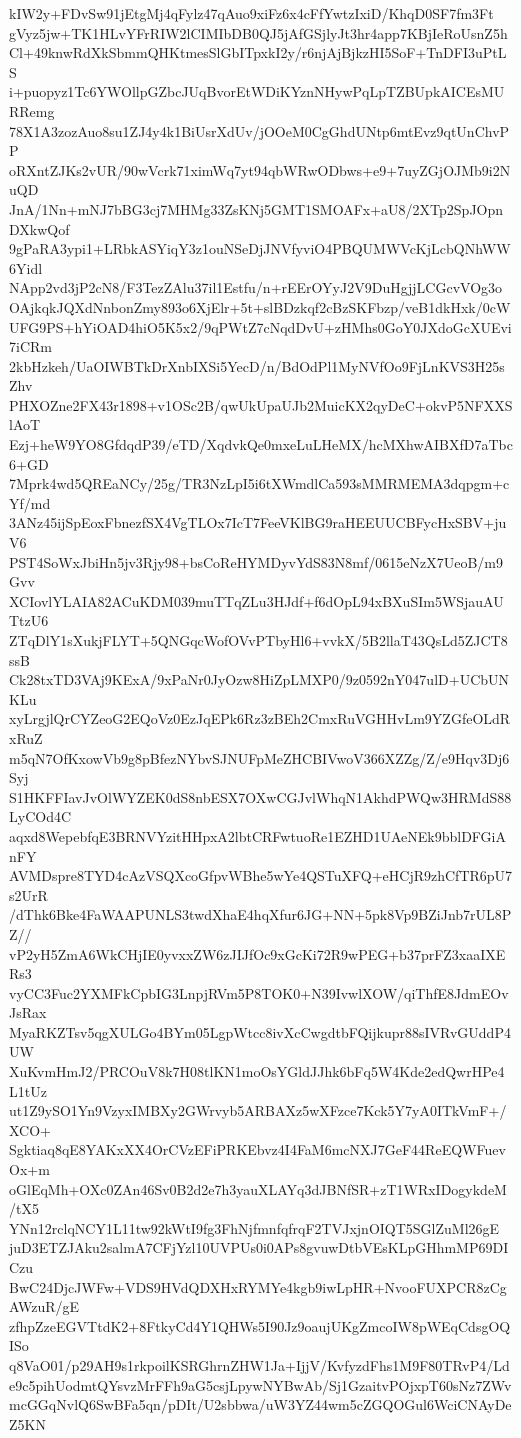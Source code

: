 kIW2y+FDvSw91jEtgMj4qFylz47qAuo9xiFz6x4cFfYwtzIxiD/KhqD0SF7fm3Ft
gVyz5jw+TK1HLvYFrRIW2lCIMIbDB0QJ5jAfGSjlyJt3hr4app7KBjIeRoUsnZ5h
Cl+49knwRdXkSbmmQHKtmesSlGbITpxkI2y/r6njAjBjkzHI5SoF+TnDFI3uPtLS
i+puopyz1Tc6YWOllpGZbcJUqBvorEtWDiKYznNHywPqLpTZBUpkAICEsMURRemg
78X1A3zozAuo8su1ZJ4y4k1BiUsrXdUv/jOOeM0CgGhdUNtp6mtEvz9qtUnChvPP
oRXntZJKs2vUR/90wVcrk71ximWq7yt94qbWRwODbws+e9+7uyZGjOJMb9i2NuQD
JnA/1Nn+mNJ7bBG3cj7MHMg33ZsKNj5GMT1SMOAFx+aU8/2XTp2SpJOpnDXkwQof
9gPaRA3ypi1+LRbkASYiqY3z1ouNSeDjJNVfyviO4PBQUMWVcKjLcbQNhWW6Yidl
NApp2vd3jP2cN8/F3TezZAlu37il1Estfu/n+rEErOYyJ2V9DuHgjjLCGcvVOg3o
OAjkqkJQXdNnbonZmy893o6XjElr+5t+slBDzkqf2cBzSKFbzp/veB1dkHxk/0cW
UFG9PS+hYiOAD4hiO5K5x2/9qPWtZ7cNqdDvU+zHMhs0GoY0JXdoGcXUEvi7iCRm
2kbHzkeh/UaOIWBTkDrXnbIXSi5YecD/n/BdOdPl1MyNVfOo9FjLnKVS3H25sZhv
PHXOZne2FX43r1898+v1OSc2B/qwUkUpaUJb2MuicKX2qyDeC+okvP5NFXXSlAoT
Ezj+heW9YO8GfdqdP39/eTD/XqdvkQe0mxeLuLHeMX/hcMXhwAIBXfD7aTbc6+GD
7Mprk4wd5QREaNCy/25g/TR3NzLpI5i6tXWmdlCa593sMMRMEMA3dqpgm+cYf/md
3ANz45ijSpEoxFbnezfSX4VgTLOx7IcT7FeeVKlBG9raHEEUUCBFycHxSBV+juV6
PST4SoWxJbiHn5jv3Rjy98+bsCoReHYMDyvYdS83N8mf/0615eNzX7UeoB/m9Gvv
XCIovlYLAIA82ACuKDM039muTTqZLu3HJdf+f6dOpL94xBXuSIm5WSjauAUTtzU6
ZTqDlY1sXukjFLYT+5QNGqcWofOVvPTbyHl6+vvkX/5B2llaT43QsLd5ZJCT8ssB
Ck28txTD3VAj9KExA/9xPaNr0JyOzw8HiZpLMXP0/9z0592nY047ulD+UCbUNKLu
xyLrgjlQrCYZeoG2EQoVz0EzJqEPk6Rz3zBEh2CmxRuVGHHvLm9YZGfeOLdRxRuZ
m5qN7OfKxowVb9g8pBfezNYbvSJNUFpMeZHCBIVwoV366XZZg/Z/e9Hqv3Dj6Syj
S1HKFFIavJvOlWYZEK0dS8nbESX7OXwCGJvlWhqN1AkhdPWQw3HRMdS88LyCOd4C
aqxd8WepebfqE3BRNVYzitHHpxA2lbtCRFwtuoRe1EZHD1UAeNEk9bblDFGiAnFY
AVMDspre8TYD4cAzVSQXcoGfpvWBhe5wYe4QSTuXFQ+eHCjR9zhCfTR6pU7s2UrR
/dThk6Bke4FaWAAPUNLS3twdXhaE4hqXfur6JG+NN+5pk8Vp9BZiJnb7rUL8PZ//
vP2yH5ZmA6WkCHjIE0yvxxZW6zJIJfOc9xGcKi72R9wPEG+b37prFZ3xaaIXERs3
vyCC3Fuc2YXMFkCpbIG3LnpjRVm5P8TOK0+N39IvwlXOW/qiThfE8JdmEOvJsRax
MyaRKZTsv5qgXULGo4BYm05LgpWtcc8ivXcCwgdtbFQijkupr88sIVRvGUddP4UW
XuKvmHmJ2/PRCOuV8k7H08tlKN1moOsYGldJJhk6bFq5W4Kde2edQwrHPe4L1tUz
ut1Z9ySO1Yn9VzyxIMBXy2GWrvyb5ARBAXz5wXFzce7Kck5Y7yA0ITkVmF+/XCO+
Sgktiaq8qE8YAKxXX4OrCVzEFiPRKEbvz4I4FaM6mcNXJ7GeF44ReEQWFuevOx+m
oGlEqMh+OXc0ZAn46Sv0B2d2e7h3yauXLAYq3dJBNfSR+zT1WRxIDogykdeM/tX5
YNn12rclqNCY1L11tw92kWtI9fg3FhNjfmnfqfrqF2TVJxjnOIQT5SGlZuMl26gE
juD3ETZJAku2salmA7CFjYzl10UVPUs0i0APs8gvuwDtbVEsKLpGHhmMP69DICzu
BwC24DjcJWFw+VDS9HVdQDXHxRYMYe4kgb9iwLpHR+NvooFUXPCR8zCgAWzuR/gE
zfhpZzeEGVTtdK2+8FtkyCd4Y1QHWs5I90Jz9oaujUKgZmcoIW8pWEqCdsgOQISo
q8VaO01/p29AH9s1rkpoilKSRGhrnZHW1Ja+IjjV/KvfyzdFhs1M9F80TRvP4/Ld
e9c5pihUodmtQYsvzMrFFh9aG5csjLpywNYBwAb/Sj1GzaitvPOjxpT60sNz7ZWv
mcGGqNvlQ6SwBFa5qn/pDIt/U2sbbwa/uW3YZ44wm5cZGQOGul6WciCNAyDeZ5KN
